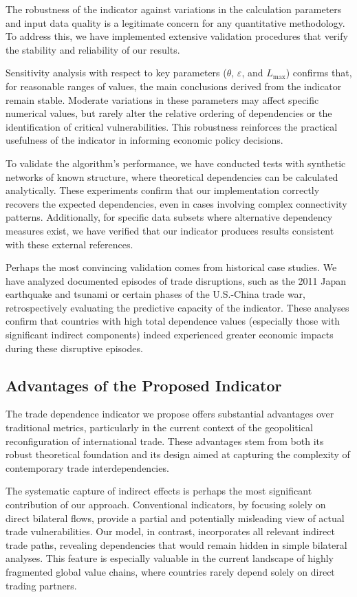 \documentclass[final,1p,times,authoryear]{elsarticle}
\begin{document}
The robustness of the indicator against variations in the calculation parameters and input data quality is a legitimate concern for any quantitative methodology. To address this, we have implemented extensive validation procedures that verify the stability and reliability of our results.

Sensitivity analysis with respect to key parameters ($\theta$, $\varepsilon$, and $L_{\max}$) confirms that, for reasonable ranges of values, the main conclusions derived from the indicator remain stable. Moderate variations in these parameters may affect specific numerical values, but rarely alter the relative ordering of dependencies or the identification of critical vulnerabilities. This robustness reinforces the practical usefulness of the indicator in informing economic policy decisions.

To validate the algorithm’s performance, we have conducted tests with synthetic networks of known structure, where theoretical dependencies can be calculated analytically. These experiments confirm that our implementation correctly recovers the expected dependencies, even in cases involving complex connectivity patterns. Additionally, for specific data subsets where alternative dependency measures exist, we have verified that our indicator produces results consistent with these external references.

Perhaps the most convincing validation comes from historical case studies. We have analyzed documented episodes of trade disruptions, such as the 2011 Japan earthquake and tsunami or certain phases of the U.S.-China trade war, retrospectively evaluating the predictive capacity of the indicator. These analyses confirm that countries with high total dependence values (especially those with significant indirect components) indeed experienced greater economic impacts during these disruptive episodes.

\subsection{Advantages of the Proposed Indicator}

The trade dependence indicator we propose offers substantial advantages over traditional metrics, particularly in the current context of the geopolitical reconfiguration of international trade. These advantages stem from both its robust theoretical foundation and its design aimed at capturing the complexity of contemporary trade interdependencies.

The systematic capture of indirect effects is perhaps the most significant contribution of our approach. Conventional indicators, by focusing solely on direct bilateral flows, provide a partial and potentially misleading view of actual trade vulnerabilities. Our model, in contrast, incorporates all relevant indirect trade paths, revealing dependencies that would remain hidden in simple bilateral analyses. This feature is especially valuable in the current landscape of highly fragmented global value chains, where countries rarely depend solely on direct trading partners.
\end{document}

